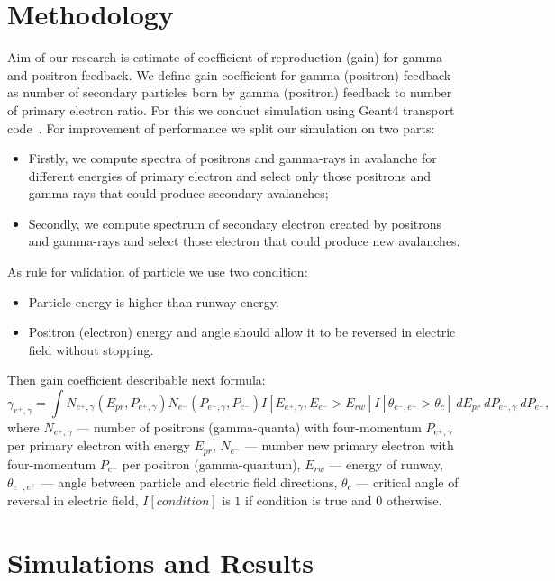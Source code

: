 \documentclass{webofc}
\begin{document}
\section{Methodology}
Aim of our research is estimate of coefficient of reproduction (gain) for gamma and positron feedback. We define gain coefficient for gamma (positron) feedback as number of secondary particles born by gamma (positron) feedback to number of primary electron  ratio. For this we conduct simulation using Geant4 transport code~\cite{ALLISON2016186}. For improvement of performance we split our simulation on two parts:
\begin{itemize}
\item Firstly, we compute spectra of positrons and gamma-rays in avalanche for different energies of primary electron and select only those positrons and gamma-rays that could produce secondary avalanches;
\item Secondly, we compute spectrum of secondary electron created by positrons and gamma-rays and select those electron that could produce new avalanches.
\end{itemize}
As rule for validation of particle we use two condition:
\begin{itemize}
\item Particle energy is higher than runway energy.
\item Positron (electron) energy and angle should allow it to be reversed in electric field without stopping.
\end{itemize}
Then gain coefficient describable next formula:
\begin{equation}
\label{eq-gain}
\gamma_{e^+, \gamma} = \int N_{e^+, \gamma}(E_{pr},P_{e^+, \gamma}) 
N_{e^-}(P_{e^+, \gamma}, P_{e^-})
I[E_{e^+, \gamma}, E_{e^-} > E_{rw}] I[\theta_{e^-, e^+} > \theta_{c}]
~dE_{pr}~dP_{e^+, \gamma}~dP_{e^-},
\end{equation}
where $N_{e^+, \gamma}$ --- number of positrons (gamma-quanta) with four-momentum $P_{e^+, \gamma}$ per primary electron with energy $E_{pr}$, $N_{e^-}$ --- number new primary electron with four-momentum $P_{e^-}$ per positron (gamma-quantum), $E_{rw}$ --- energy of runway, $\theta_{e^-, e^+}$ --- angle between particle and electric field directions, $\theta_c$ --- critical angle of reversal in electric field,   $I[condition]$ is $1$ if condition is true and $0$ otherwise.
\section{Simulations and Results}
\end{document}
